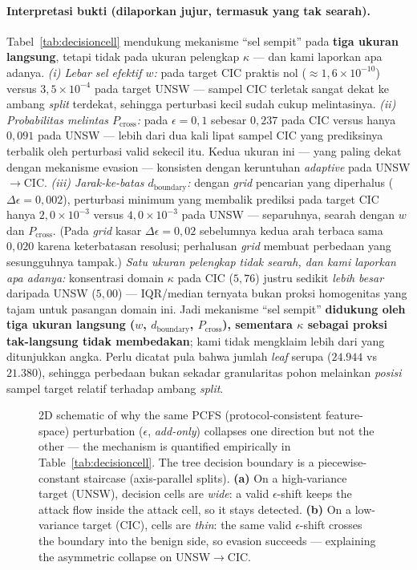 \documentclass[11pt,a4paper]{article}
\begin{document}
\paragraph{Interpretasi bukti (dilaporkan jujur, termasuk yang tak searah).}
Tabel~\ref{tab:decisioncell} mendukung mekanisme ``sel sempit'' pada \textbf{tiga
ukuran langsung}, tetapi tidak pada ukuran pelengkap $\kappa$ --- dan kami laporkan
apa adanya.
\emph{(i) Lebar sel efektif $w$:} pada target CIC praktis nol
($\approx 1{,}6\times10^{-10}$) versus $3{,}5\times10^{-4}$ pada target UNSW ---
sampel CIC terletak sangat dekat ke ambang \emph{split} terdekat, sehingga perturbasi
kecil sudah cukup melintasinya. \emph{(ii) Probabilitas melintas $P_{\text{cross}}$:}
pada $\epsilon{=}0{,}1$ sebesar $0{,}237$ pada CIC versus hanya $0{,}091$ pada UNSW
--- lebih dari dua kali lipat sampel CIC yang prediksinya terbalik oleh perturbasi
valid sekecil itu. Kedua ukuran ini --- yang paling dekat dengan mekanisme evasion
--- konsisten dengan keruntuhan \emph{adaptive} pada UNSW$\rightarrow$CIC.
\emph{(iii) Jarak-ke-batas $d_{\text{boundary}}$:} dengan \emph{grid} pencarian
yang diperhalus ($\Delta\epsilon{=}0{,}002$), perturbasi minimum yang membalik
prediksi pada target CIC hanya $2{,}0\times10^{-3}$ versus $4{,}0\times10^{-3}$ pada
UNSW --- separuhnya, searah dengan $w$ dan $P_{\text{cross}}$. (Pada \emph{grid}
kasar $\Delta\epsilon{=}0{,}02$ sebelumnya kedua arah terbaca sama $0{,}020$ karena
keterbatasan resolusi; perhalusan \emph{grid} membuat perbedaan yang sesungguhnya
tampak.) \emph{Satu ukuran pelengkap tidak searah, dan kami laporkan apa adanya:}
konsentrasi domain $\kappa$ pada CIC ($5{,}76$) justru sedikit \emph{lebih besar}
daripada UNSW ($5{,}00$) --- IQR/median ternyata bukan proksi homogenitas yang tajam
untuk pasangan domain ini. Jadi mekanisme ``sel sempit'' \textbf{didukung oleh tiga
ukuran langsung ($w$, $d_{\text{boundary}}$, $P_{\text{cross}}$), sementara $\kappa$
sebagai proksi tak-langsung tidak membedakan}; kami tidak mengklaim lebih dari yang
ditunjukkan angka.
Perlu dicatat pula bahwa jumlah \emph{leaf} serupa ($24{.}944$ vs $21{.}380$),
sehingga perbedaan bukan sekadar granularitas pohon melainkan \emph{posisi} sampel
target relatif terhadap ambang \emph{split}.

\begin{figure}[h]
\centering
\resizebox{0.95\linewidth}{!}{}
\caption{2D schematic of why the same PCFS (protocol-consistent feature-space)
perturbation ($\epsilon$, \emph{add-only}) collapses one direction but not the
other --- the mechanism is quantified empirically in Table~\ref{tab:decisioncell}.
The tree decision boundary is a piecewise-constant staircase (axis-parallel splits).
\textbf{(a)} On a high-variance target (UNSW), decision cells are \emph{wide}: a
valid $\epsilon$-shift keeps the attack flow inside the attack cell, so it stays
detected. \textbf{(b)} On a low-variance target (CIC), cells are \emph{thin}: the
same valid $\epsilon$-shift crosses the boundary into the benign side, so evasion
succeeds --- explaining the asymmetric collapse on UNSW$\rightarrow$CIC.}
\label{fig:treeboundary}
\end{figure}
\end{document}
